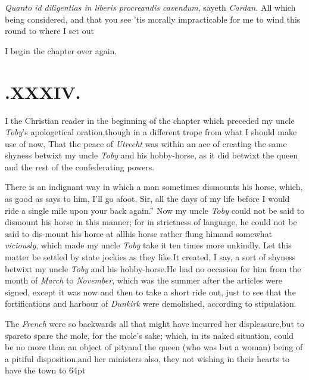 \documentclass{article}
\begin{document}
\textit{Quanto id diligentias in liberis procreandis cavendum},
sayeth \textit{Cardan.} All which being considered, and that you see
’tis morally impracticable for me to wind this round to
where I set out\tsh

I begin the chapter over again.

\section{.\enspace XXXIV.}

\lettrine{I}{ } the Christian reader in the beginning of the chapter which
preceded my uncle \textit{Toby}’s apologetical oration,\tsk though in a different
trope from what I should make use of now, That the peace of \textit{Utrecht} was
within an ace of creating the same shyness betwixt my uncle \textit{Toby} and his
hobby-horse, as it did betwixt the queen and the rest of the confederating powers.

There is an indignant way in which a\break
man sometimes dismounts his horse,\break
which, as good as says to him, \lqq I’ll go\break
\lqq afoot, Sir, all the days of my life\break
\lqq before I would ride a single mile upon\break
\lqq your back again.” Now my uncle \textit{Toby} could not be
said to dismount his horse in this manner; for in strictness of language, he could
not be said to dis-\pb mount his horse at all\tsh his horse rather flung him\tsh and
somewhat \textit{viciously}, which made my uncle \textit{Toby} take it ten times
more unkindly. Let this matter be settled by state jockies as they like.\tsh It
created, I say, a sort of shyness betwixt my uncle \textit{Toby} and his
hobby-horse.\tsh He had no occasion for him from the month of \textit{March} to
\textit{November}, which was the summer after the articles were signed, except it
was now and then to take a short ride out, just to see that the fortifications and
harbour of \textit{Dunkirk} were demolished, according to stipulation.

The \textit{French} were so backwards all that\break
{}
\pb 
might have
incurred her displeasure,\tsk but to spare\tsk to spare the
mole, for the mole’s sake; which, in its naked situation,
could be no more than an object of pity\tsh and the queen
(who was but a woman) being of a pitiful
disposition,\tsk and her ministers also, they not wishing in
their hearts to have the town 
\stick{\astfill}
\hbox to 64pt{\astfill\tsh}
\end{document}
